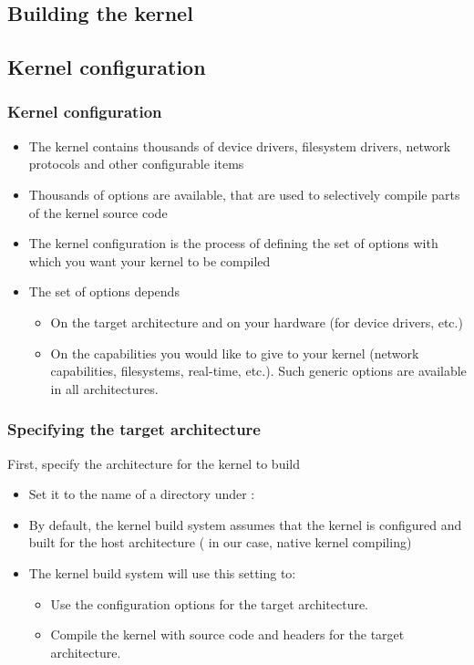 \subsection{Building the kernel}

\subsection{Kernel configuration}

\begin{frame}
  \frametitle{Kernel configuration}
  \begin{itemize}
  \item The kernel contains thousands of device drivers, filesystem
    drivers, network protocols and other configurable items
  \item Thousands of options are available, that are used to
    selectively compile parts of the kernel source code
  \item The kernel configuration is the process of defining the set of
    options with which you want your kernel to be compiled
  \item The set of options depends
    \begin{itemize}
    \item On the target architecture and on your hardware (for device drivers, etc.)
    \item On the capabilities you would like to give to your kernel
      (network capabilities, filesystems, real-time, etc.).
      Such generic options are available in all architectures.
    \end{itemize}
  \end{itemize}
\end{frame}

\begin{frame}
  \frametitle{Specifying the target architecture}
  First, specify the architecture for the kernel to build
  \begin{itemize}
  \item Set it to the name of a directory under :\\
  \item By default, the kernel build system assumes that the
        kernel is configured and built for the host architecture
	( in our case, native kernel compiling)
  \item The kernel build system will use this setting to:
	\begin{itemize}
	\item Use the configuration options for the target
	      architecture.
	\item Compile the kernel with source code and headers
	      for the target architecture.
	\end{itemize}
  \end{itemize}
\end{frame}

